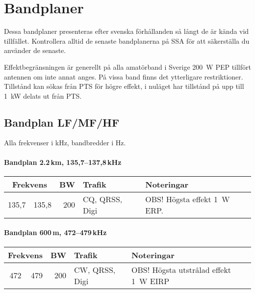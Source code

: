\onecolumn

\chapter{Bandplaner}
\label{bandplaner2}

\noindent Dessa bandplaner presenteras efter svenska förhållanden så långt de
är kända vid tillfället. Kontrollera alltid de senaste bandplanerna på SSA för
att säkerställa du använder de senaste.

Effektbegränsningen är generellt på alla amatörband i Sverige \SI{200}{W} PEP
tillfört antennen om inte annat anges. På vissa band finns det ytterligare
restriktioner. Tillstånd kan sökas från PTS för högre effekt, i nuläget har
tillstånd på upp till \SI{1}{kW} delats ut från PTS.

\section{Bandplan LF/MF/HF}

Alla frekvenser i kHz, bandbredder i Hz.

\subsubsection{Bandplan 2.2\,km, 135,7--137,8\,kHz}
\begin{tabular}{rrrll}
\multicolumn{2}{c}{\textbf{Frekvens}} & \textbf{BW} & \textbf{Trafik} & \textbf{Noteringar} \\ \hline
135,7 & 135,8 & 200 & CQ, QRSS, Digi & OBS! Högsta effekt \SI{1}{W} ERP. \\ \hline
\end{tabular}

\subsubsection{Bandplan 600\,m, 472--479\,kHz}
\begin{tabular}{rrrll}
\multicolumn{2}{c}{\textbf{Frekvens}} & \textbf{BW} & \textbf{Trafik} & \textbf{Noteringar} \\ \hline
472 & 479 & 200 & CW, QRSS, Digi & OBS! Högsta utstrålad effekt \SI{1}{W} EIRP \\ \hline
\end{tabular}

